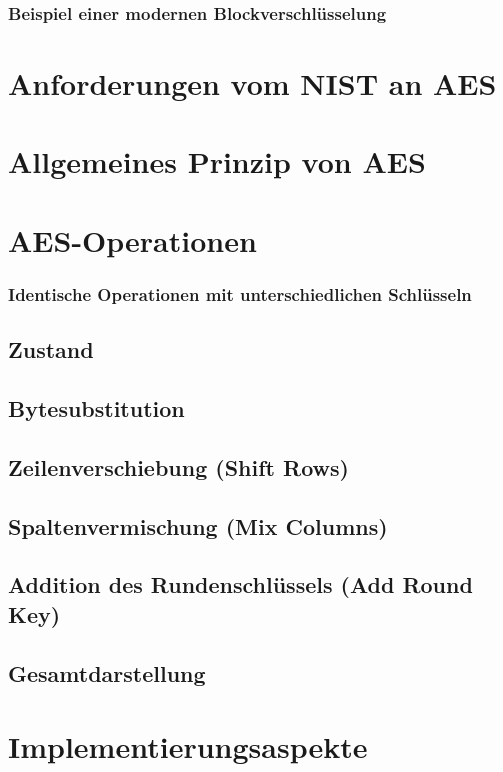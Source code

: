 \subsubsection*{Beispiel einer modernen Blockverschlüsselung}
\section{Anforderungen vom NIST an AES}
\section{Allgemeines Prinzip von AES}
\section{AES-Operationen}
\subsubsection*{Identische Operationen mit unterschiedlichen Schlüsseln}
\subsection{Zustand}
\subsection{Bytesubstitution}
\subsection{Zeilenverschiebung (Shift Rows)}
\subsection{Spaltenvermischung (Mix Columns)}
\subsection{Addition des Rundenschlüssels (Add Round Key)}
\subsection{Gesamtdarstellung}

\section{Implementierungsaspekte}













